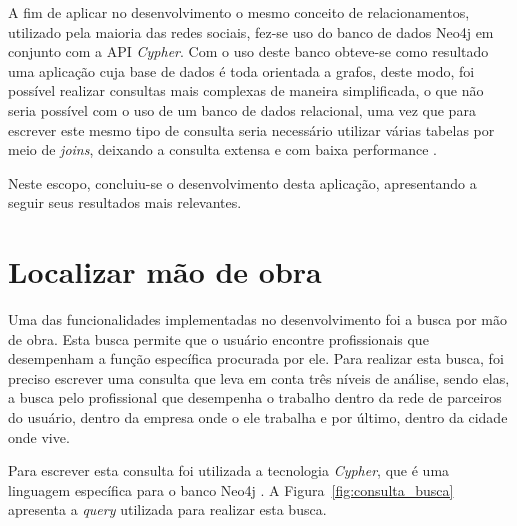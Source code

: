 \par A fim de aplicar no desenvolvimento o mesmo conceito de relacionamentos, utilizado pela maioria das redes sociais, fez-se uso do banco de dados Neo4j em conjunto com a API \textit{Cypher}. Com o uso deste banco obteve-se como resultado uma aplicação cuja base de dados é toda orientada a grafos, deste modo, foi possível realizar consultas mais complexas de maneira simplificada, o que não seria possível com o uso de um banco de dados relacional, uma vez que para escrever este mesmo tipo de consulta seria necessário utilizar várias tabelas por meio de \textit{joins}, deixando a consulta extensa e com baixa performance \cite{sadalage_fowler_nosql_distilled_brief_guide}.

\par Neste escopo, concluiu-se o desenvolvimento desta aplicação, apresentando a seguir seus resultados mais relevantes.


\section{Localizar mão de obra}

\par Uma das funcionalidades implementadas no desenvolvimento foi a busca por mão de obra. Esta busca permite que o usuário encontre profissionais que desempenham a função específica procurada por ele. Para realizar esta busca, foi preciso escrever uma consulta que leva em conta três níveis de análise, sendo elas, a busca pelo profissional que desempenha o trabalho dentro da rede de parceiros do usuário, dentro da empresa onde o ele trabalha e por último, dentro da cidade onde vive.  

\par Para escrever esta consulta foi utilizada a tecnologia \textit{Cypher}, que é uma linguagem específica para o banco Neo4j \cite{neo4j_team_manual}. A Figura~\ref{fig:consulta_busca} apresenta a \textit{query} utilizada para realizar esta busca.


